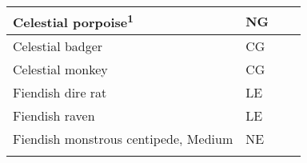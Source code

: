 \begin{longtable}{llll}
\hline
\multicolumn{1}{p{0.069in}|}{\begin{minipage}[t]{0.069in}\raggedright
Celestial porpoise\textsuperscript{\textbf{1}}\end{minipage}} & \multicolumn{1}{p{0.069in}|}{\begin{minipage}[t]{0.069in}\raggedright
NG\end{minipage}}\\
\hline
\multicolumn{1}{|p{3.326in}|}{\begin{minipage}[t]{3.326in}\raggedright
Celestial badger\end{minipage}} & \multicolumn{3}{p{0.601in}|}{\begin{minipage}[t]{0.601in}\raggedright
CG\end{minipage}}\\
\hline
\multicolumn{1}{|p{3.326in}|}{\begin{minipage}[t]{3.326in}\raggedright
Celestial monkey\end{minipage}} & \multicolumn{3}{p{0.601in}|}{\begin{minipage}[t]{0.601in}\raggedright
CG\end{minipage}}\\
\hline
\multicolumn{1}{|p{3.326in}|}{\begin{minipage}[t]{3.326in}\raggedright
Fiendish dire rat\end{minipage}} & \multicolumn{3}{p{0.601in}|}{\begin{minipage}[t]{0.601in}\raggedright
LE\end{minipage}}\\
\hline
\multicolumn{1}{|p{3.326in}|}{\begin{minipage}[t]{3.326in}\raggedright
Fiendish raven\end{minipage}} & \multicolumn{3}{p{0.601in}|}{\begin{minipage}[t]{0.601in}\raggedright
LE\end{minipage}}\\
\hline
\multicolumn{1}{|p{3.326in}|}{\begin{minipage}[t]{3.326in}\raggedright
Fiendish monstrous centipede, Medium\end{minipage}} & \multicolumn{3}{p{0.601in}|}{\begin{minipage}[t]{0.601in}\raggedright
NE\end{minipage}}\\
\hline
\multicolumn{1}{|p{3.326in}|}{\begin{minipage}[t]{3.326in}\raggedright

\end{minipage}}
\end{longtable}
